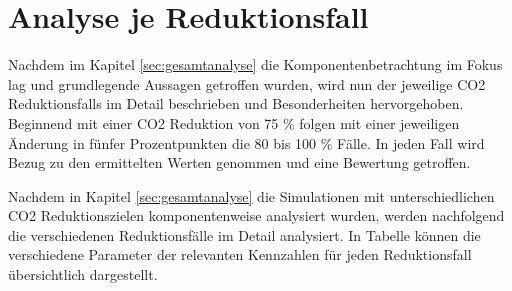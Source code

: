 \section{Analyse je Reduktionsfall}
\label{sec:reduktionsfaelle}
Nachdem im Kapitel \ref{sec:gesamtanalyse} die Komponentenbetrachtung im Fokus lag und grundlegende Aussagen getroffen wurden, wird nun der jeweilige CO2 Reduktionsfalls im Detail beschrieben und Besonderheiten hervorgehoben. Beginnend mit einer CO2 Reduktion von 75 \% folgen mit einer jeweiligen Änderung in fünfer Prozentpunkten die 80 bis 100 \% Fälle. In jeden Fall wird Bezug zu den ermittelten Werten genommen und eine Bewertung getroffen.

Nachdem in Kapitel \ref{sec:gesamtanalyse} die Simulationen mit unterschiedlichen CO2 Reduktionszielen komponentenweise analysiert wurden, werden nachfolgend die verschiedenen Reduktionsfälle im Detail analysiert. In Tabelle  können die verschiedene Parameter der relevanten Kennzahlen für jeden Reduktionsfall übersichtlich dargestellt.




